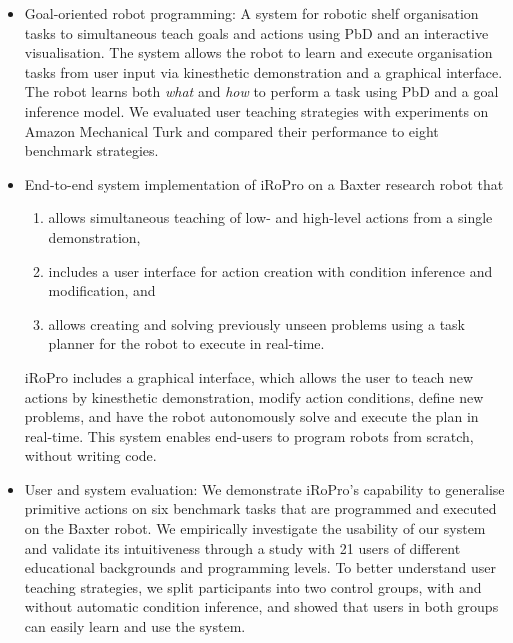 \begin{itemize}
	\item {Goal-oriented robot programming: A system for robotic shelf organisation tasks to simultaneous teach goals and actions using PbD and an interactive visualisation. %
		The system allows the robot to learn and execute organisation tasks from user input via kinesthetic demonstration and a graphical interface.
		The robot learns both \textit{what} and \textit{how} to perform a task using PbD and a goal inference model.
		We evaluated user teaching strategies with experiments on Amazon Mechanical Turk and compared their performance to eight benchmark strategies.\\
}

	\item {End-to-end system implementation of iRoPro on a Baxter research robot that 
		\begin{enumerate}
			\item allows simultaneous teaching of low- and high-level actions from a single demonstration, 
			\item includes a user interface for action creation with condition inference and modification, and
			\item allows creating and solving previously unseen problems using a task planner for the robot to execute in real-time.
		\end{enumerate}
	iRoPro includes a graphical interface, which allows the user to teach new actions by kinesthetic demonstration, modify action conditions, define new problems, and have the robot autonomously solve and execute the plan in real-time.
	This system enables end-users to program robots from scratch, without writing code.%
}

	\item {User and system evaluation:
	We demonstrate iRoPro's capability to generalise primitive actions on six benchmark tasks that are programmed and executed on the Baxter robot.
	We empirically investigate the usability of our system and validate its intuitiveness through a study with 21 users of different educational backgrounds and programming levels.
	To better understand user teaching strategies, we split participants into two control groups, with and without automatic condition inference, and showed that users in both groups can easily learn and use the system.}
	
	
\end{itemize}

